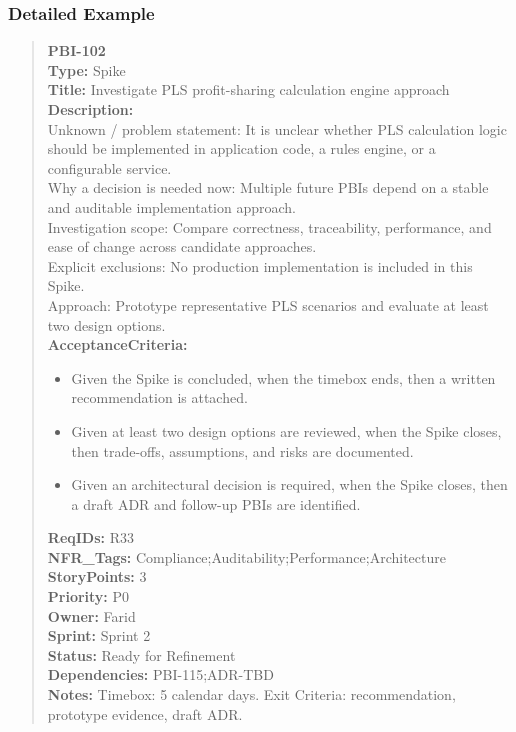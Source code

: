 \documentclass[11pt,a4paper]{article}
\begin{document}
\subsubsection*{Detailed Example}
\begin{quote}
\textbf{PBI-102} \\
\textbf{Type:} Spike \\
\textbf{Title:} Investigate PLS profit-sharing calculation engine approach \\

\textbf{Description:} \\
Unknown / problem statement: It is unclear whether PLS calculation logic should be implemented in application code, a rules engine, or a configurable service. \\
Why a decision is needed now: Multiple future PBIs depend on a stable and auditable implementation approach. \\
Investigation scope: Compare correctness, traceability, performance, and ease of change across candidate approaches. \\
Explicit exclusions: No production implementation is included in this Spike. \\
Approach: Prototype representative PLS scenarios and evaluate at least two design options. \\

\textbf{AcceptanceCriteria:}
\begin{itemize}[leftmargin=1.5em]
    \item Given the Spike is concluded, when the timebox ends, then a written recommendation is attached.
    \item Given at least two design options are reviewed, when the Spike closes, then trade-offs, assumptions, and risks are documented.
    \item Given an architectural decision is required, when the Spike closes, then a draft ADR and follow-up PBIs are identified.
\end{itemize}

\textbf{ReqIDs:} R33 \\
\textbf{NFR\_Tags:} Compliance;Auditability;Performance;Architecture \\
\textbf{StoryPoints:} 3 \\
\textbf{Priority:} P0 \\
\textbf{Owner:} Farid \\
\textbf{Sprint:} Sprint 2 \\
\textbf{Status:} Ready for Refinement \\
\textbf{Dependencies:} PBI-115;ADR-TBD \\
\textbf{Notes:} Timebox: 5 calendar days. Exit Criteria: recommendation, prototype evidence, draft ADR.
\end{quote}
\end{document}
